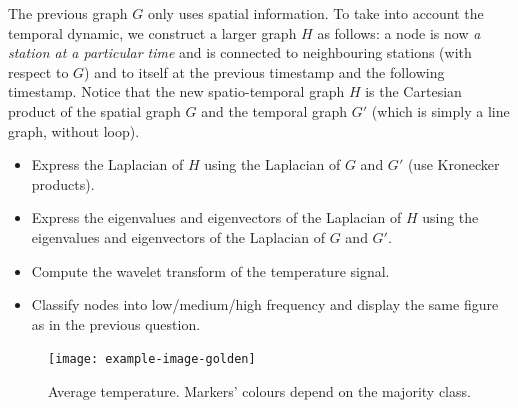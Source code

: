 \documentclass[11pt]{article}
\begin{document}
\newpage
\begin{exercise}
The previous graph $G$ only uses spatial information.
To take into account the temporal dynamic, we construct a larger graph $H$ as follows: a node is now \textit{a station at a particular time} and is connected to neighbouring stations (with respect to $G$) and to itself at the previous timestamp and the following timestamp.
Notice that the new spatio-temporal graph $H$ is the Cartesian product of the spatial graph $G$ and the temporal graph $G'$ (which is simply a line graph, without loop).

\begin{itemize}
    \item Express the Laplacian of $H$ using the Laplacian of $G$ and $G'$ (use Kronecker products).
    \item Express the eigenvalues and eigenvectors of the Laplacian of $H$ using the eigenvalues and eigenvectors of the Laplacian of $G$ and $G'$.
    \item Compute the wavelet transform of the temperature signal.
    \item Classify nodes into low/medium/high frequency and display the same figure as in the previous question.
\end{itemize}
\end{exercise}

\begin{solution}


    
\begin{figure}
    \centering
    \begin{minipage}[t]{0.8\textwidth}
    \centerline{\texttt{[image: example-image-golden]}}
    \end{minipage}
    \caption{Average temperature. Markers' colours depend on the majority class.}
\end{figure}
\end{solution}
\end{document}
